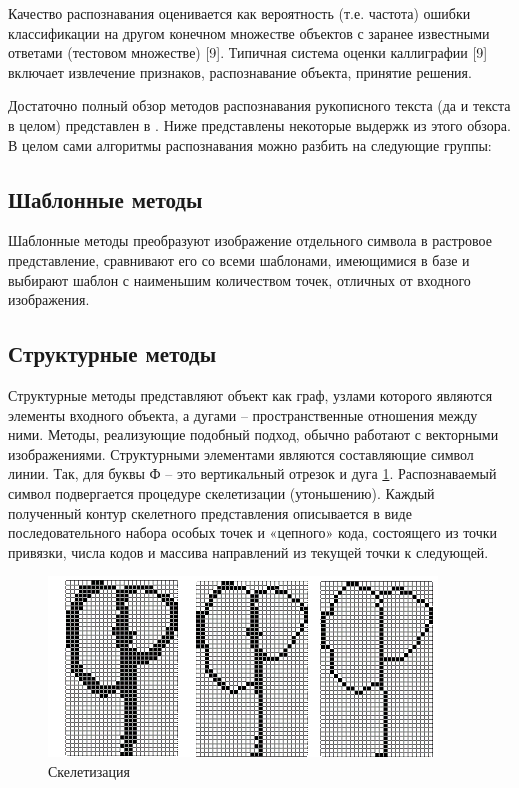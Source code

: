 Качество распознавания оценивается как вероятность (т.е. частота) ошибки
классификации на другом конечном множестве объектов с заранее известными
ответами (тестовом множестве) [9]. Типичная система оценки каллиграфии [9] включает извлечение признаков, распознавание объекта, принятие решения.

Достаточно полный обзор методов распознавания рукописного текста (да и текста в целом) представлен в \cite{demin}. Ниже представлены некоторые выдержк из этого обзора.
В целом сами алгоритмы распознавания можно разбить на следующие группы:

\subsection{Шаблонные методы}

Шаблонные методы преобразуют изображение отдельного символа в растровое
представление, сравнивают его со всеми шаблонами, имеющимися в базе и выбирают
шаблон с наименьшим количеством точек, отличных от входного изображения.

\subsection{Структурные методы}

Структурные методы представляют объект как граф, узлами которого
являются элементы входного объекта, а дугами -- пространственные отношения между
ними. Методы, реализующие подобный подход, обычно работают с векторными
изображениями. Структурными элементами являются составляющие символ линии.
Так, для буквы Ф -- это вертикальный отрезок и дуга \ref{img_skelet}. Распознаваемый символ
подвергается процедуре скелетизации (утоньшению). Каждый полученный
контур скелетного представления описывается в виде последовательного набора
особых точек и «цепного» кода, состоящего из точки привязки, числа кодов и массива
направлений из текущей точки к следующей.

\begin{figure}[h]
\centering
\includegraphics[width=0.75\linewidth,keepaspectratio]{images/intro_skelet_1}
\caption{Скелетизация}
\label{img_skelet}
\end{figure}

